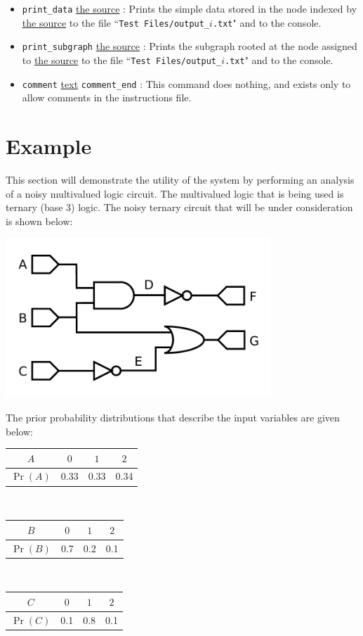\documentclass{article}
\begin{document}
\begin{itemize}
%
\item \texttt{print\_data} \underline{the source} : Prints the simple data stored in the node indexed by \underline{the source} to the file ``\texttt{Test Files/output\_\(i\).txt}" and to the console.
%
\item \texttt{print\_subgraph} \underline{the source} : Prints the subgraph rooted at the node assigned to \underline{the source} to the file ``\texttt{Test Files/output\_\(i\).txt}" and to the console.
%
\item \texttt{comment} \underline{text} \texttt{comment\_end} : This command does nothing, and exists only to allow comments in the instructions file.
\end{itemize}


\section{Example}

This section will demonstrate the utility of the system by performing an analysis of a noisy multivalued logic circuit. The multivalued logic that is being used is ternary (base 3) logic. The noisy ternary circuit that will be under consideration is shown below:

\includegraphics[width=0.75\textwidth]{example_fuzzy_logic_circuit}

The prior probability distributions that describe the input variables are given below:

\begin{tabular}{|c||c|c|c|}
\hline
\(A\) & \(0\) & \(1\) & \(2\) \\ 
\hline
\hline
\(\Pr(A)\) & 0.33 & 0.33 & 0.34 \\
\hline
\end{tabular}
~
\begin{tabular}{|c||c|c|c|}
\hline
\(B\) & \(0\) & \(1\) & \(2\) \\ 
\hline
\hline
\(\Pr(B)\) & 0.7 & 0.2 & 0.1 \\
\hline
\end{tabular}
~
\begin{tabular}{|c||c|c|c|}
\hline
\(C\) & \(0\) & \(1\) & \(2\) \\ 
\hline
\hline
\(\Pr(C)\) & 0.1 & 0.8 & 0.1 \\
\hline
\end{tabular}
\end{document}
